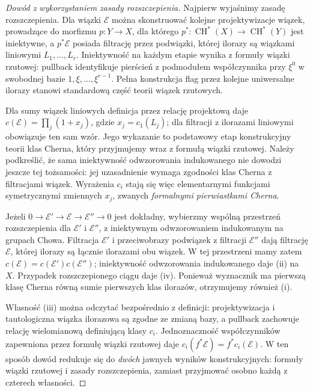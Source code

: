 \documentclass[11pt,a4paper,openany]{report}
\numberwithin{equation}{section}
\theoremstyle{plain}
\theoremstyle{definition}
\theoremstyle{remark}
\begin{document}
\begin{proof}[Dowód z wykorzystaniem zasady rozszczepienia]
Najpierw wyjaśnimy zasadę rozszczepienia. Dla wiązki
$\mathcal E$ można skonstruować kolejne projektywizacje
wiązek, prowadzące do morfizmu $p:Y\to X$, dla którego
$p^*:\operatorname{CH}^*(X)\to\operatorname{CH}^*(Y)$
jest iniektywne, a $p^*\mathcal E$ posiada filtrację
przez podwiązki, której ilorazy są wiązkami liniowymi
$L_1,\ldots,L_r$. Iniektywność na każdym etapie
wynika z formuły wiązki rzutowej: pullback
identyfikuje pierścień z podmodułem współczynnika
przy $\xi^0$ w swobodnej bazie $1,\xi,\ldots,\xi^{r-1}$.
Pełna konstrukcja flag przez kolejne uniwersalne ilorazy
stanowi standardową część teorii wiązek rzutowych.

Dla sumy wiązek liniowych definicja przez relację
projektową daje
$c(\mathcal E)=\prod_j(1+x_j)$,
gdzie $x_j=c_1(L_j)$; dla filtracji z ilorazami liniowymi
obowiązuje ten sam wzór. Jego wykazanie to podstawowy
etap konstrukcyjny teorii klas Cherna, który
przyjmujemy wraz z formułą wiązki rzutowej.
Należy podkreślić, że sama iniektywność odwzorowania indukowanego
nie dowodzi jeszcze tej tożsamości: jej uzasadnienie
wymaga zgodności klas Cherna z filtracjami wiązek.
Wyrażenia $c_i$ stają się więc elementarnymi funkcjami
symetrycznymi zmiennych $x_j$, zwanych
\emph{formalnymi pierwiastkami Cherna}.

Jeżeli $0\to\mathcal E'\to\mathcal E\to\mathcal E''\to0$
jest dokładny, wybierzmy wspólną przestrzeń rozszczepienia
dla $\mathcal E'$ i $\mathcal E''$, z iniektywnym
odwzorowaniem indukowanym na grupach Chowa. Filtracja
$\mathcal E'$ i przeciwobrazy podwiązek z filtracji
$\mathcal E''$ dają filtrację $\mathcal E$,
której ilorazy są łącznie ilorazami obu wiązek.
W tej przestrzeni mamy zatem
$c(\mathcal E)=c(\mathcal E')c(\mathcal E'')$;
iniektywność odwzorowania indukowanego daje (ii) na $X$.
Przypadek rozszczepionego ciągu daje (iv).
Ponieważ wyznacznik ma pierwszą klasę Cherna równą
sumie pierwszych klas ilorazów, otrzymujemy również (i).

Własność (iii) można odczytać bezpośrednio z definicji:
projektywizacja i tautologiczna wiązka ilorazowa
są zgodne ze zmianą bazy, a pullback zachowuje relację
wielomianową definiującą klasy $c_i$. Jednoznaczność
współczynników zapewniona przez formułę wiązki rzutowej
daje $c_i(f^*\mathcal E)=f^*c_i(\mathcal E)$.
W ten sposób dowód redukuje się do \emph{dwóch} jawnych
wyników konstrukcyjnych: formuły wiązki rzutowej
i zasady rozszczepienia, zamiast przyjmować osobno
każdą z czterech własności.
\end{proof}
\end{document}

